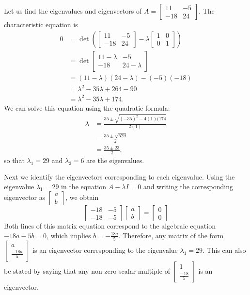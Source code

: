 \documentclass[12pt,letterpaper,twoside]{amsart}
\newcounter{example}
\newcommand{\example}{\bigskip \noindent {\large {\sc Example \arabic{example}:}} \addtocounter{example}{1}}
\newcommand{\I}{\left[ \begin{matrix} 1 & 0 \\ 0 & 1 \end{matrix} \right]}
\newcommand{\startmatrix}{\left[ \begin{matrix}}
\newcommand{\finishmatrix}{\end{matrix} \right]}
\begin{document}
\example Let us find the eigenvalues and eigenvectors of $A = \left[ \begin{matrix} 11 & -5 \\ -18 & 24 \end{matrix} \right]$. The characteristic equation is
\begin{align*}
0 & = \det \left( \left[ \begin{matrix} 11 & -5 \\ -18 & 24 \end{matrix} \right] - \lambda \I \right) \\
& = \det \left[ \begin{matrix} 11-\lambda & -5 \\ -18 & 24-\lambda \end{matrix} \right] \\
& = (11-\lambda)(24-\lambda)-(-5)(-18) \\
& = \lambda^2 - 35 \lambda + 264 -90 \\
& = \lambda^2 -35 \lambda + 174.
\end{align*}
We can solve this equation using the quadratic formula:
\begin{align*}
\lambda & = \frac{35 \pm \sqrt{(-35)^2-4(1)(174}}{2(1)} \\
& = \frac{35 \pm \sqrt{529}}{2} \\
& = \frac{35 \pm 23}{2},
\end{align*}
so that $\lambda_1 = 29$ and $\lambda_2 = 6$ are the eigenvalues.

Next we identify the eigenvectors corresponding to each eigenvalue.  Using the eigenvalue $\lambda_1=29$ in the equation $A-\lambda I=0$ and writing the corresponding eigenvector as $\startmatrix a \\ b \finishmatrix$, we obtain
\[ \startmatrix -18 & -5 \\ -18 & -5 \finishmatrix  \startmatrix a \\ b \finishmatrix = \startmatrix 0 \\ 0 \finishmatrix \]
Both lines of this matrix equation correspond to the algebraic equation $-18a-5b=0$, which implies $b = -\frac{18a}{5}$.  Therefore, any matrix of the form $\startmatrix a \\ \frac{-18a}{5} \finishmatrix$ is an eigenvector corresponding to the eigenvalue $\lambda_1=29$.  This can also be stated by saying that any non-zero scalar multiple of $\startmatrix 1 \\ \frac{-18}{5} \finishmatrix$ is an eigenvector.
\end{document}
